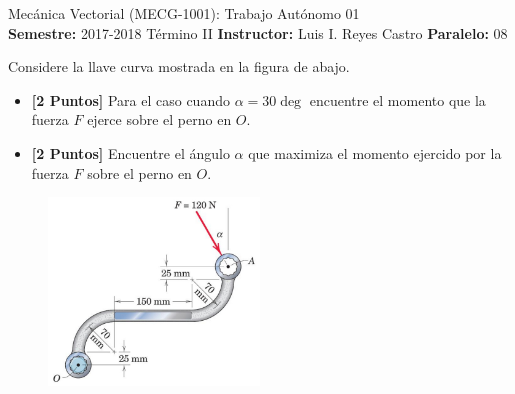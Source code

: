 \documentclass[ a4paper, twoside, 11pt]{article}
\newcommand{\numero}{01}
\begin{document}
\allowdisplaybreaks

\begin{center}
\Large Mec\'anica Vectorial (MECG-1001): Trabajo Aut\'onomo \numero \\[2ex]
\small \textbf{Semestre:} 2017-2018 T\'ermino II \qquad
\textbf{Instructor:} Luis I. Reyes Castro \qquad
\textbf{Paralelo:} 08
\end{center}
\fullskip

\begin{problem}
Considere la llave curva mostrada en la figura de abajo. 
\begin{itemize}
\item \textbf{[2 Puntos]} Para el caso cuando $\alpha = 30\deg$ encuentre el momento que la fuerza $F$ ejerce sobre el perno en $O$. 
\item \textbf{[2 Puntos]} Encuentre el \'angulo $\alpha$ que maximiza el momento ejercido por la fuerza $F$ sobre el perno en $O$. 
\end{itemize}

\begin{figure}[htb]
\centering
\includegraphics[width=0.5\textwidth]{problema.jpg}
\end{figure}

\end{problem}
\vspace{\baselineskip}
\end{document}
